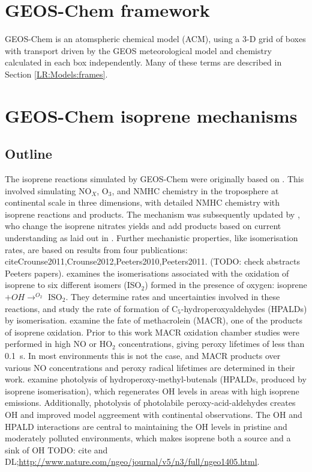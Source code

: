 \section{GEOS-Chem framework}
  \label{Model:GC_frame}
  GEOS-Chem is an atomspheric chemical model (ACM), using a 3-D grid of boxes with transport driven by the GEOS meteorological model and chemistry calculated in each box independently. 
  Many of these terms are described in Section \ref{LR:Models:frames}.
    
\section{GEOS-Chem isoprene mechanisms}
  \label{Model:GC_isop}
  \subsection{Outline}
    The isoprene reactions simulated by GEOS-Chem were originally based on \cite{Horowitz1998}.
    This involved simulating NO$_X$, O$_3$, and NMHC chemistry in the troposphere at continental scale in three dimensions, with detailed NMHC chemistry with isoprene reactions and products.
    The mechanism was subsequently updated by \citet{Mao2013}, who change the isoprene nitrates yields and add products based on current understanding as laid out in \citet{Paulot2009a,Paulot2009b}.
    Further mechanistic properties, like isomerisation rates, are based on results from four publications: cite{Crounse2011,Crounse2012,Peeters2010,Peeters2011}.
    (TODO: check abstracts Peeters papers).
    \cite{Crounse2011} examines the isomerisations associated with the oxidation of isoprene to six different isomers (ISO$_2$) formed in the presence of oxygen: isoprene $ + OH \rightarrow^{O_2} $ ISO$_2$.
    They determine rates and uncertainties involved in these reactions, and study the rate of formation of C$_5$-hydroperoxyaldehydes (HPALDs) by isomerisation.
    \cite{Crounse2012} examine the fate of methacrolein (MACR), one of the products of isoprene oxidation. 
    Prior to this work MACR oxidation chamber studies were performed in high NO or HO$_2$ concentrations, giving peroxy lifetimes of less than 0.1~s.
    In most environments this is not the case, and MACR products over various NO concentrations and peroxy radical lifetimes are determined in their work.
    \cite{Peeters2010} examine photolysis of hydroperoxy-methyl-butenals (HPALDs, produced by isoprene isomerisation), which regenerates OH levels in areas with high isoprene emissions.
    Additionally, photolysis of photolabile peroxy-acid-aldehydes creates OH and improved model aggreement with continental observations.
    The OH and HPALD interactions are central to maintaining the OH levels in pristine and moderately polluted environments, which makes isoprene both a source and a sink of OH TODO: cite and DL;\url{http://www.nature.com/ngeo/journal/v5/n3/full/ngeo1405.html}.
    
